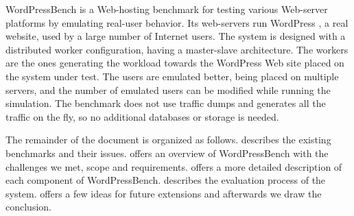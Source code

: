 WordPressBench is a Web-hosting benchmark for testing various Web-server platforms by emulating real-user behavior.  Its web-servers run WordPress \cite{Wordpress-website}, a real website, used by a large number of Internet users. The system is designed with a distributed worker configuration, having a master-slave architecture. The workers are the ones generating the workload towards the WordPress Web site placed on the system under test. The users are emulated better, being placed on multiple servers, and the number of emulated users can be modified while running the simulation. The benchmark does not use traffic dumps and generates all the traffic on the fly, so no additional databases or storage is needed.

The remainder of the document is organized as follows.  describes the existing benchmarks and their issues.  offers an overview of WordPressBench with the challenges we met, scope and requirements.  offers a more detailed description of each component of  WordPressBench.  describes the evaluation process of the system.  offers a few ideas for future extensions and afterwards we draw the conclusion.
